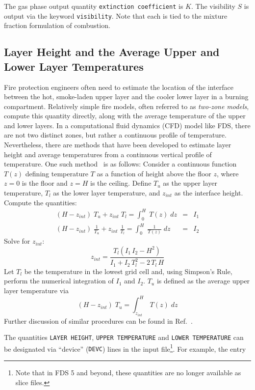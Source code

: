 \documentclass[11pt]{book}
\newcommand{\ct}{\tt\small}
\newcommand{\be}{\begin{equation}}
\newcommand{\ee}{\end{equation}}
\begin{document}
The gas phase output quantity {\ct extinction coefficient} is $K$.
The visibility $S$ is output via the keyword {\ct visibility}. Note
that each is tied to the mixture fraction formulation of combustion.


\subsection{Layer Height and the Average Upper and Lower Layer Temperatures}
\label{info:layerheight}

Fire protection engineers often need to estimate the location of the interface between
the hot, smoke-laden upper layer and the cooler lower layer in a burning compartment.
Relatively simple fire models, often referred to as {\em two-zone models}, compute
this quantity directly, along with the average temperature of the upper and lower layers.
In a computational fluid dynamics (CFD) model like FDS, there are not two distinct zones,
but rather a continuous profile of temperature. Nevertheless, there are methods that
have been developed to estimate layer height and average temperatures from a continuous
vertical profile of temperature. One such method~\cite{Janssens:JFS1992} is as follows:
Consider a continuous function $T(z)$ defining temperature $T$ as a function of height above
the floor $z$, where $z=0$ is the floor and $z=H$ is the ceiling. Define $T_u$ as the
upper layer temperature, $T_l$ as the lower layer temperature, and $z_{int}$ as the
interface height. Compute the quantities:
\begin{eqnarray*} (H-z_{int})\; T_u + z_{int} \; T_l = \int_0^H \; T(z) \; dz &=& I_1 \\
                  (H-z_{int})\; \frac{1}{T_u} + z_{int} \; \frac{1}{T_l} = \int_0^H \; \frac{1}{T(z)} \; dz &=& I_2 \end{eqnarray*}
Solve for $z_{int}$:
\be z_{int} = \frac{ T_l(I_1 \, I_2 - H^2)}{I_1+I_2 \, T_l^2 - 2\, T_l \, H} \ee
Let $T_l$ be the temperature in the lowest grid cell and, using Simpson's Rule, perform the
numerical integration of $I_1$ and $I_2$. $T_u$ is defined as the average upper layer
temperature via
\be (H-z_{int})\; T_u = \int_{z_{int}}^H \; T(z) \; dz \ee
Further discussion of similar procedures can be found in Ref.~\cite{He:1}.

The quantities {\ct LAYER HEIGHT}, {\ct UPPER TEMPERATURE} and {\ct LOWER TEMPERATURE}
can be designated via ``device'' ({\ct DEVC}) lines in the input file\footnote{Note that in FDS 5 and beyond, these quantities
are no longer available as slice files.}. For example, the entry
\end{document}
